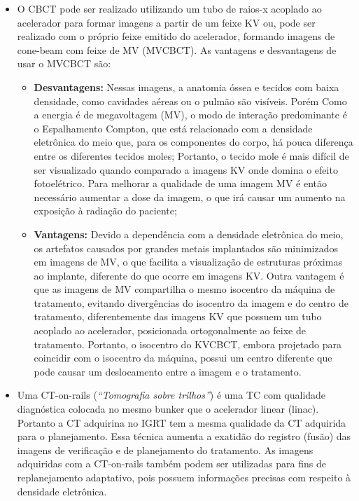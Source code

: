 \documentclass[11pt,a4paper]{article}
\newcounter{exemplo}
\begin{document}
\begin{exemplo}[12. IGRT ]
\begin{itemize}
        \item O CBCT pode ser realizado utilizando um tubo de raios-x acoplado ao acelerador para formar imagens a partir de um feixe KV ou, pode ser realizado com o próprio feixe emitido do acelerador, formando imagens de cone-beam com feixe de MV (MVCBCT). As vantagens e desvantagens de usar o MVCBCT são:
            \begin{itemize}[label=\textcolor{CarnationPink}{$\blacktriangleright$}]
                \item \textbf{Desvantagens:} Nessas imagens, a anatomia óssea e tecidos com baixa densidade, como cavidades aéreas ou o pulmão são visíveis. Porém Como a energia é de megavoltagem (MV), o modo de interação predominante é o Espalhamento Compton, que está relacionado com a densidade eletrônica do meio que, para os componentes do corpo, há pouca diferença entre os diferentes tecidos moles; Portanto, o tecido mole é mais difícil de ser visualizado quando comparado a imagens KV onde domina o efeito fotoelétrico. Para melhorar a qualidade de uma imagem MV é então necessário aumentar a dose da imagem, o que irá causar um aumento na exposição à radiação do paciente;
                
                \item \textbf{Vantagens:} Devido a dependência com a densidade eletrônica do meio, os artefatos causados por grandes metais implantados são minimizados em imagens de MV, o que facilita a visualização de estruturas próximas ao implante, diferente do que ocorre em imagens KV. Outra vantagem é que as imagens de MV compartilha o mesmo isocentro da máquina de tratamento, evitando divergências do isocentro da imagem e do centro de tratamento, diferentemente das imagens KV que possuem um tubo acoplado ao acelerador, posicionada ortogonalmente ao feixe de tratamento. Portanto, o isocentro do KVCBCT, embora projetado para coincidir com o isocentro da máquina, possui um centro diferente que pode causar um deslocamento entre a imagem e o tratamento. 
            \end{itemize}
        
        \item Uma CT-on-rails (\textit{``Tomografia sobre trilhos''}) é uma TC com qualidade diagnóstica colocada no mesmo bunker que o acelerador linear (linac). Portanto a CT adquirina no IGRT tem a mesma qualidade da CT adquirida para o planejamento. Essa técnica aumenta a exatidão do registro (fusão) das imagens de verificação e de planejamento do tratamento. As imagens adquiridas com a CT-on-rails também podem ser utilizadas para fins de replanejamento adaptativo, pois possuem informações precisas com respeito à densidade eletrônica.
        

\end{itemize}
\end{exemplo}
\end{document}
